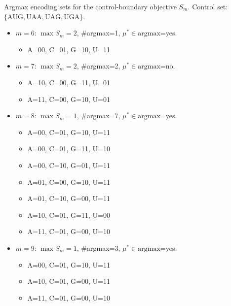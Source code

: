 Argmax encoding sets for the control-boundary objective $S_m$.
Control set: $\{\mathrm{AUG},\allowbreak \mathrm{UAA},\allowbreak \mathrm{UAG},\allowbreak \mathrm{UGA}\}$.

\begin{itemize}
\item $m=6$: $\max S_m=2$, \#argmax=1, $\mu^\ast\in\mathrm{argmax}$=yes.
  \begin{itemize}
  \item A=00, C=01, G=10, U=11
  \end{itemize}
\item $m=7$: $\max S_m=2$, \#argmax=2, $\mu^\ast\in\mathrm{argmax}$=no.
  \begin{itemize}
  \item A=10, C=00, G=11, U=01
  \item A=11, C=00, G=10, U=01
  \end{itemize}
\item $m=8$: $\max S_m=1$, \#argmax=7, $\mu^\ast\in\mathrm{argmax}$=yes.
  \begin{itemize}
  \item A=00, C=01, G=10, U=11
  \item A=00, C=01, G=11, U=10
  \item A=00, C=10, G=01, U=11
  \item A=01, C=00, G=10, U=11
  \item A=01, C=10, G=00, U=11
  \item A=10, C=01, G=11, U=00
  \item A=11, C=01, G=00, U=10
  \end{itemize}
\item $m=9$: $\max S_m=1$, \#argmax=3, $\mu^\ast\in\mathrm{argmax}$=yes.
  \begin{itemize}
  \item A=00, C=01, G=10, U=11
  \item A=10, C=01, G=00, U=11
  \item A=11, C=01, G=00, U=10
  \end{itemize}
\end{itemize}

